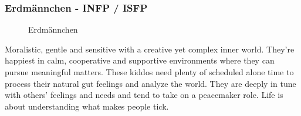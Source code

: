 \subsubsection{Erdmännchen - INFP / ISFP}
\begin{figure}[htbp!]
	\centering
	\caption[Erdmännchen]{Erdmännchen \cite{knowAndLove}}
	\label{img:Elephant}
\end{figure}
Moralistic, gentle and sensitive with a creative yet complex inner world. They're happiest in calm, cooperative and supportive environments where they can pursue meaningful matters. These kiddos need plenty of scheduled alone time to process their natural gut feelings and analyze the world. They are deeply in tune with others' feelings and needs and tend to take on a peacemaker role. Life is about understanding what makes people tick. \\	
